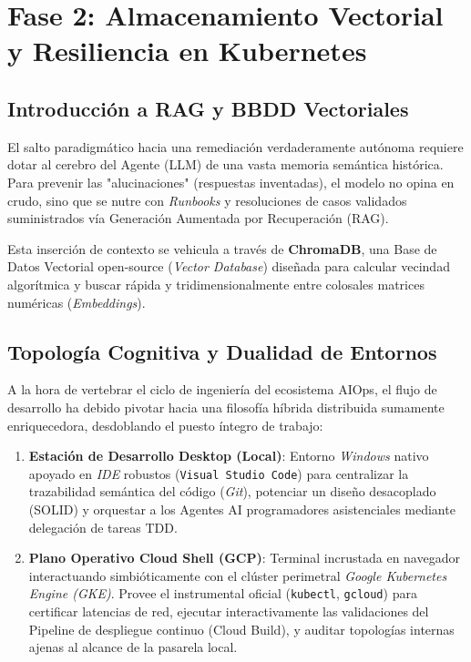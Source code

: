 \chapter{Fase 2: Almacenamiento Vectorial y Resiliencia en Kubernetes}

\section{Introducción a RAG y BBDD Vectoriales}
El salto paradigmático hacia una remediación verdaderamente autónoma requiere dotar al cerebro del Agente (LLM) de una vasta memoria semántica histórica. Para prevenir las "alucinaciones" (respuestas inventadas), el modelo no opina en crudo, sino que se nutre con \textit{Runbooks} y resoluciones de casos validados suministrados vía Generación Aumentada por Recuperación (RAG).

Esta inserción de contexto se vehicula a través de \textbf{ChromaDB}, una Base de Datos Vectorial open-source (\textit{Vector Database}) diseñada para calcular vecindad algorítmica y buscar rápida y tridimensionalmente entre colosales matrices numéricas (\textit{Embeddings}).

\section{Topología Cognitiva y Dualidad de Entornos}
A la hora de vertebrar el ciclo de ingeniería del ecosistema AIOps, el flujo de desarrollo ha debido pivotar hacia una filosofía híbrida distribuida sumamente enriquecedora, desdoblando el puesto íntegro de trabajo:
\begin{enumerate}
    \item \textbf{Estación de Desarrollo Desktop (Local)}: Entorno \textit{Windows} nativo apoyado en \textit{IDE} robustos (\texttt{Visual Studio Code}) para centralizar la trazabilidad semántica del código (\textit{Git}), potenciar un diseño desacoplado (SOLID) y orquestar a los Agentes AI programadores asistenciales mediante delegación de tareas TDD.
    \item \textbf{Plano Operativo Cloud Shell (GCP)}: Terminal incrustada en navegador interactuando simbióticamente con el clúster perimetral \textit{Google Kubernetes Engine (GKE)}. Provee el instrumental oficial (\texttt{kubectl}, \texttt{gcloud}) para certificar latencias de red, ejecutar interactivamente las validaciones del Pipeline de despliegue continuo (Cloud Build), y auditar topologías internas ajenas al alcance de la pasarela local.
\end{enumerate}

